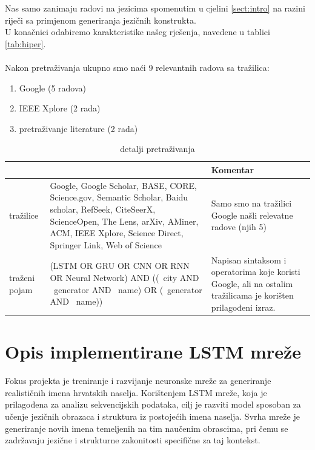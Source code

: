\documentclass[conference]{IEEEtran}
\begin{document}
Nas samo zanimaju radovi na jezicima spomenutim u cjelini \ref{sect:intro} na razini riječi sa primjenom generiranja jezičnih konstrukta.\\
U konačnici odabiremo karakteristike našeg rješenja, navedene u tablici \ref{tab:hiper}.\\
\\
Nakon pretraživanja ukupno smo naći 9 relevantnih radova sa tražilica:
\begin{enumerate}
\item Google (5 radova)
\item IEEE Xplore (2 rada)
\item pretraživanje literature (2 rada)
\end{enumerate}
\begin{table}[htbp]
\caption{detalji pretraživanja}
\begin{center}
\begin{tabular}{|p{50pt}|p{110pt}|p{50pt}|}
\hline
 & & \textbf{Komentar}\\ \hline
tražilice & Google, Google Scholar, BASE, CORE, Science.gov, Semantic Scholar, Baidu scholar, RefSeek, CiteSeerX, ScienceOpen, The Lens, arXiv, AMiner, ACM, IEEE Xplore, Science Direct,  Springer Link, Web of Science & Samo smo na tražilici Google našli relevatne radove (njih 5)  \\ \hline
traženi pojam & (LSTM OR GRU OR CNN OR RNN OR Neural Network) AND ((~city AND ~generator AND ~name) OR (~generator AND ~name)) & Napisan sintaksom i operatorima koje koristi Google, ali na ostalim tražilicama je korišten prilagođeni izraz.\\ \hline
\end{tabular}
\label{tab:trening}
\end{center}
\end{table}





\section{Opis implementirane LSTM mreže}
Fokus projekta je treniranje i razvijanje neuronske mreže za generiranje realističnih imena hrvatskih naselja. Korištenjem LSTM mreže, koja je prilagođena za analizu sekvencijskih podataka, cilj je razviti model sposoban za učenje jezičnih obrazaca i struktura iz postojećih imena naselja. Svrha mreže je generiranje novih imena temeljenih na tim naučenim obrascima, pri čemu se zadržavaju jezične i strukturne zakonitosti specifične za taj kontekst.
\end{document}
